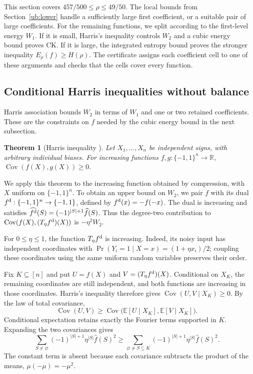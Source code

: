 \documentclass[11pt,letterpaper]{amsart}
\newcommand{\E}{\mathbb E}
\newcommand{\R}{\mathbb R}
\newcommand{\1}{\mathbf 1}
\DeclareMathOperator{\Cov}{Cov}
\newtheorem{theorem}{Theorem}[section]
\numberwithin{equation}{section}
\begin{document}
This section covers $457/500\le\rho\le49/50$.
The local bounds from Section~\ref{ub:lower} handle a sufficiently
large first coefficient, or a suitable pair of large coefficients.
For the remaining functions, we split
according to the first-level energy $W_1$. If it is small, Harris's
inequality controls $W_2$ and a cubic energy bound proves CK.
If it is large, the integrated entropy bound proves the stronger
inequality $E_\rho(f)\ge H(\rho)$. The certificate assigns each
coefficient cell to one of these arguments and checks that the cells
cover every function.

\subsection{Conditional Harris inequalities without balance}

Harris association bounds $W_2$ in terms of $W_1$ and one or two
retained coefficients. These are the constraints on $f$ needed by
the cubic energy bound in the next subsection.

\begin{theorem}[Harris inequality {\cite{Harris1960}}]
Let $X_1,\ldots,X_n$ be independent signs, with arbitrary
individual biases. For increasing functions
$f,g:\{-1,1\}^n\to\R$,
$\Cov(f(X),g(X))\ge0$.
\end{theorem}

We apply this theorem to the increasing function obtained by
compression, with $X$ uniform on $\{-1,1\}^n$.
To obtain an upper bound on $W_2$, we pair $f$ with its dual
$f^{\rm d}:\{-1,1\}^n\to\{-1,1\}$, defined by
$f^{\rm d}(x)=-f(-x)$.
The dual is increasing and satisfies
$\widehat{f^{\rm d}}(S)=(-1)^{|S|+1}\widehat f(S)$.
Thus the degree-two contribution to
$\Cov(f(X),(T_\eta f^{\rm d})(X))$ is $-\eta^2W_2$.

For $0\le\eta\le1$, the function $T_\eta f^{\rm d}$ is increasing.
Indeed, its noisy input has independent coordinates with
$\Pr(Y_i=1\mid X=x)=(1+\eta x_i)/2$; coupling these coordinates
using the same uniform random variables preserves their order.

Fix $K\subseteq[n]$ and put
$U=f(X)$ and $V=(T_\eta f^{\rm d})(X)$.
Conditional on $X_K$, the remaining coordinates are still
independent, and both functions are increasing in those coordinates.
Harris's inequality therefore gives $\Cov(U,V\mid X_K)\ge0$.
By the law of total covariance,
\[
 \Cov(U,V)
 \ge \Cov\bigl(\E[U\mid X_K],\E[V\mid X_K]\bigr).
\]
Conditional expectation retains exactly the Fourier terms
supported in $K$. Expanding the two covariances gives
\begin{equation}\label{jp:core-harris}
 \sum_{S\ne\varnothing}
   (-1)^{|S|+1}\eta^{|S|}\widehat f(S)^2
 \ge
 \sum_{\varnothing\ne S\subseteq K}
   (-1)^{|S|+1}\eta^{|S|}\widehat f(S)^2.
\end{equation}
The constant term is absent because each covariance subtracts
the product of the means, $\mu(-\mu)=-\mu^2$.
\end{document}
